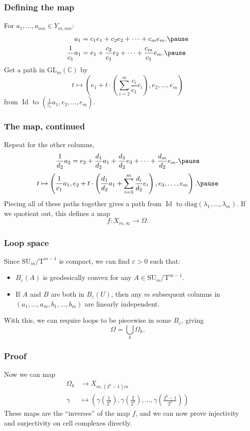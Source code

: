 \documentclass{beamer} %
\newcommand{\C}{\mathbb{C}}
\newcommand{\GL}{\mathrm{GL}}
\newcommand{\SU}{\mathrm{SU}}
\DeclareMathOperator{\Id}{Id}
\newcommand{\T}{\mathrm{T}}
\newcommand{\g}{\gamma}
\newcommand{\e}{\varepsilon}
\renewcommand{\l}{\lambda}
\begin{document}
\begin{frame}
  \frametitle{Defining the map}
  For $a_1,\dots,a_{mn} \in Y_{m,mn}:$
  \begin{align*}
    a_1 &= c_1 e_1 + c_2 e_2 + \dots + c_m e_m. \pause \\
    \frac{1}{c_1}a_1 &= e_1 + \frac{c_2}{c_1}e_2 + \dots +
                       \frac{c_m}{c_1}e_m. \pause
  \end{align*}
  Get a path in $\GL_m(\C)$ by
  \[ t \mapsto \left(e_1 + t \cdot \left(\sum_{i=2}^m
    \frac{c_i}{c_1}e_i\right), e_2,\dots,e_m\right) \]
  from $\Id$ to $\left(\frac{1}{c_1}a_1,e_2,\dots,e_m\right)$.
\end{frame}

\begin{frame}
  \frametitle{The map, continued}
  Repeat for the other columns,
  \[ \frac{1}{d_2}a_2 = e_2 + \frac{d_1}{d_2}a_1 +
  \frac{d_3}{d_2}e_3+\dots + \frac{d_m}{d_2}e_m.\pause \]
  \[ t \mapsto \left(\frac{1}{c_1}{a_1}, e_2 +
    t\cdot\left(\frac{d_1}{d_2} a_1 + \sum_{i=3}^m
      \frac{d_i}{d_2}e_i\right),e_3,\dots,e_m \right). \pause\]
  Piecing all of these paths together gives a path from $\Id$ to
  $\mathrm{diag}(\l_1,\dots,\l_m)$. \pause If we quotient out, this
  defines a map
  \[ f : X_{m,\infty} \to \Omega. \]
\end{frame}

\begin{frame}
  \frametitle{Loop space}
  Since $\SU_m/\T^{m-1}$ is compact, we can find $\e > 0$ such that:
  \begin{itemize}
  \item $B_\e(A)$ is geodesically convex for any $A \in
    \SU_m/\T^{m-1}.$
  \item If $A$ and $B$ are both in $B_{\varepsilon}(U)$, then any $m$
    subsequent columns
    in $(a_1,\dots,a_m,b_1,\dots,b_m)$ are linearly independent.
  \end{itemize} \pause
  With this, we can require loops to be piecewise in some $B_\e$,
  giving
  \[ \Omega = \bigcup_k \Omega_k. \]
\end{frame}

\begin{frame}
  \frametitle{Proof}
  Now we can map
  \begin{align*}
    \Omega_k &\to X_{m,(2^k-1)m} \\
    \g &\mapsto \left( \g\left(\frac{1}{2^k}\right),
    \g\left(\frac{2}{2^k}\right), \dots,
    \g\left(\frac{2^k-1}{2^k}\right) \right)
  \end{align*} \pause
  These maps are the ``inverses'' of the map $f$, and we can now prove
  injectivity and surjectivity on cell complexes directly.
\end{frame}
\end{document}
